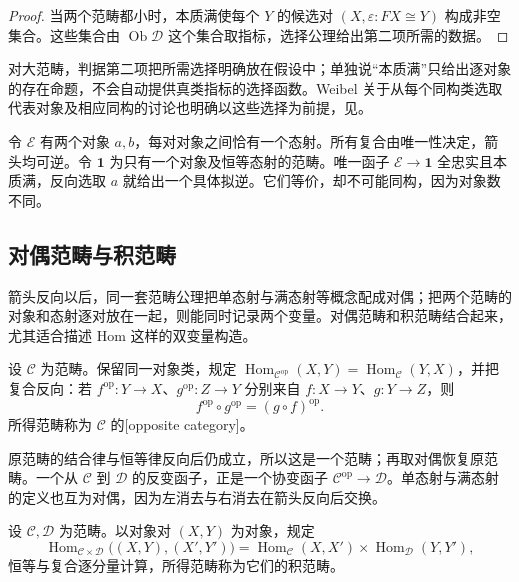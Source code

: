 \begin{proof}
	当两个范畴都小时，本质满使每个 \(Y\) 的候选对 \((X,\varepsilon:FX\cong Y)\) 构成非空集合。这些集合由 \(\operatorname{Ob}\mathcal D\) 这个集合取指标，选择公理给出第二项所需的数据。
\end{proof}

对大范畴，判据第二项把所需选择明确放在假设中；单独说“本质满”只给出逐对象的存在命题，不会自动提供真类指标的选择函数。Weibel 关于从每个同构类选取代表对象及相应同构的讨论也明确以这些选择为前提，见\cite[A.2.4, p. 422; A.3.2, pp. 423--424]{Weibel1994HomologicalAlgebra}。

\begin{example}\label{b4:ex:equivalent-not-isomorphic}
	令 \(\mathcal E\) 有两个对象 \(a,b\)，每对对象之间恰有一个态射。所有复合由唯一性决定，箭头均可逆。令 \(\mathbf1\) 为只有一个对象及恒等态射的范畴。唯一函子 \(\mathcal E\rightarrow\mathbf1\) 全忠实且本质满，反向选取 \(a\) 就给出一个具体拟逆。它们等价，却不可能同构，因为对象数不同。
\end{example}

\subsection{对偶范畴与积范畴}
\label{b4:subsec:opposite-product-categories}
\label{b4:subsec:0103:02}

箭头反向以后，同一套范畴公理把单态射与满态射等概念配成对偶；把两个范畴的对象和态射逐对放在一起，则能同时记录两个变量。对偶范畴和积范畴结合起来，尤其适合描述 Hom 这样的双变量构造。

\begin{definition}\label{b4:def:opposite-category}
	设 \(\mathcal C\) 为范畴。保留同一对象类，规定 \(\operatorname{Hom}_{\mathcal C^{\mathrm{op}}}(X,Y)=\operatorname{Hom}_{\mathcal C}(Y,X)\)，并把复合反向：若 \(f^{\mathrm{op}}:Y\rightarrow X\)、\(g^{\mathrm{op}}:Z\rightarrow Y\) 分别来自 \(f:X\rightarrow Y\)、\(g:Y\rightarrow Z\)，则
	\[
		f^{\mathrm{op}}\circ g^{\mathrm{op}}=(g\circ f)^{\mathrm{op}}.
	\]
	所得范畴称为 \(\mathcal C\) 的[opposite category]。
\end{definition}

原范畴的结合律与恒等律反向后仍成立，所以这是一个范畴；再取对偶恢复原范畴。一个从 \(\mathcal C\) 到 \(\mathcal D\) 的反变函子，正是一个协变函子 \(\mathcal C^{\mathrm{op}}\rightarrow\mathcal D\)。单态射与满态射的定义也互为对偶，因为左消去与右消去在箭头反向后交换。

\begin{definition}\label{b4:def:product-category}
	设 \(\mathcal C,\mathcal D\) 为范畴。以对象对 \((X,Y)\) 为对象，规定
	\[
		\operatorname{Hom}_{\mathcal C\times\mathcal D}\bigl((X,Y),(X',Y')\bigr) =\operatorname{Hom}_{\mathcal C}(X,X')\times\operatorname{Hom}_{\mathcal D}(Y,Y'),
	\]
	恒等与复合逐分量计算，所得范畴称为它们的积范畴。
\end{definition}

